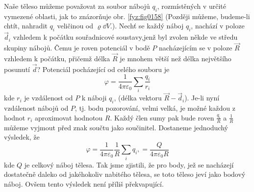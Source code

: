   Naše těleso můžeme považovat za soubor nábojů \(q_i\), rozmístěných v určité vymezené oblasti, jak
  to znázorňuje obr. \ref{fyz:fig0158} (Později můžeme, budeme-li chtít, nahradit \(q_i\) veličinou
  od \(\varrho\dd{V}\).). Nechť se každý náboj \(q_i\), nachází v poloze \(\vec{d}_i\) vzhledem k
  počátku souřadnicové soustavy,jenž byl zvolen někde ve středu skupiny nábojů. Čemu je roven
  potenciál v bodě \(P\) nacházejícím se v poloze \(\vec{R}\) vzhledem k počátku, přičemž délka
  \(\vec{R}\) je mnohem větší než délka největšího posunutí \(\vec{d}\)? Potenciál pocházející od
  celého souboru je
  \begin{equation}\label{fyz:eq267}
    \varphi = \dfrac{1}{4\pi\varepsilon_0}\sum_i\dfrac{q_i}{r_i}
  \end{equation}
  kde \(r_i\) je vzdálenost od \(P\) k náboji \(q_i\), (délka vektoru \(\vec{R}-\vec{d}_i\)). Je-li
  nyní vzdálenost nábojů od \(P\), tj. bodu pozorování, velmi velká, je možné každou z hodnot
  \(r_i\) aproximovat hodnotou \(R\). Každý člen sumy pak bude roven \(\frac{q_i}{R}\) a
  \(\frac{1}{R}\) můžeme vyjmout před znak součtu jako součinitel. Dostaneme jednoduchý výsledek, že
  \begin{equation}\label{fyz:eq268}
   \varphi = \dfrac{1}{4\pi\varepsilon_0}\dfrac{1}{R}\sum_i q_i, 
           = \dfrac{Q}{4\pi\varepsilon_0R}
  \end{equation}
  kde \(Q\) je celkový náboj tělesa. Tak jsme zjistili, že pro body, jež se nacházejí dostatečně 
  daleko od jakéhokoliv nabitého tělesa, se toto těleso jeví jako bodový náboj. Ovšem tento 
  výsledek není příliš překvapující. 
  
